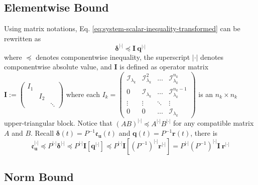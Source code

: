 \documentclass[accepted]{uai2023}
\newcommand{\vect}[1]{\mathbf{#1}}
\newcommand{\Err}{\mathfrak{e}}
\newcommand{\I}{\mathcal{I}}
\newcommand{\abs}{|\cdot|}
\begin{document}
\subsection{Elementwise Bound}
    Using matrix notations, Eq. \ref{eq:system-scalar-inequality-transformed} can be rewritten as
    \begin{equation}
        \pmb{\delta}^{\abs} \preceq \vect{I}\ \vect{q}^{\abs}
    \end{equation}
    where $\preceq$ denotes componentwise inequality, the superscript $\abs$ denotes componentwise absolute value, and $\vect{I}$ is defined as operator matrix $\vect{I} := \begin{pmatrix} I_1 \\ & I_2 \\ && \ddots \end{pmatrix}$ where each $I_k = \begin{pmatrix}
        \I_{\lambda_k} & \I_{\lambda_k}^2 & \dots &\I_{\lambda_k}^{n_k} \\
        0 & \I_{\lambda_k} & \dots &\I_{\lambda_k}^{n_k-1} \\
        \vdots & \vdots & \ddots & \vdots \\
        0 & 0 & \dots & \I_{\lambda_k}
    \end{pmatrix}$ is an $n_k \times n_k$ upper-triangular block.
    Notice that $(AB)^{\abs} \preceq A^{\abs} B^{\abs}$ for any compatible matrix $A$ and $B$. Recall $\pmb{\delta}(t) = P^{-1}\Err_{\vect{u}}(t)$ and $\pmb{q}(t) = P^{-1} \vect{r}(t)$, there is
    \begin{equation}
        \Err_{\vect{u}}^{\abs} 
        \preceq P^{\abs}\pmb{\delta}^{\abs} 
        \preceq P^{\abs} \vect{I} \left[\vect{q}^{\abs} \right]
        \preceq P^{\abs} \vect{I} \left[(P^{-1})^{\abs} \vect{r}^{\abs}\right]
        = P^{\abs} (P^{-1})^{\abs}  \vect{I}\ \vect{r}^{\abs}
    \end{equation}
\subsection{Norm Bound}

    
\end{document}
